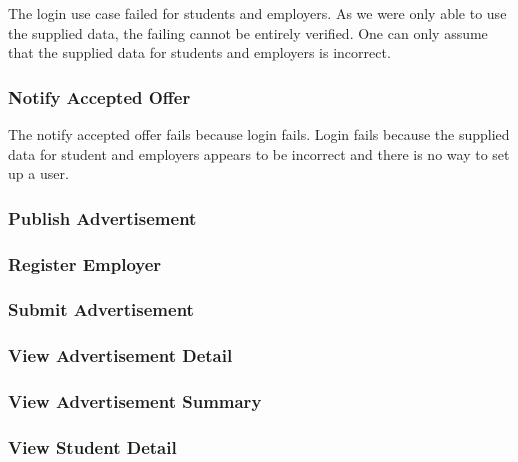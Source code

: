 \documentclass[11pt]{l3deliverable}
\begin{document}
The login use case failed for students and employers. As we were only able to
use the supplied data, the failing cannot be entirely verified. One can only
assume that the supplied data for students and employers is incorrect.

\subsubsection{Notify Accepted Offer}

The notify accepted offer fails because login fails. Login fails because the
supplied data for student and employers appears to be incorrect and there is
no way to set up a user.

\subsubsection{Publish Advertisement}

\subsubsection{Register Employer}

\subsubsection{Submit Advertisement}

\subsubsection{View Advertisement Detail}

\subsubsection{View Advertisement Summary}

\subsubsection{View Student Detail}
\end{document}
